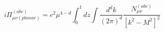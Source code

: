 \begin{equation}
i\Pi_{\mu\nu(planar)}^{(abc)}=e^{2}\mu^{4-d}\int_{0}^{1}dz\int
  \frac{d^{d}k}{(2\pi)^{d}}
  \frac{\textit{N}_{\mu\nu}^{(abc)}}{[k^{2}-M^{2}]^{2}}
  \end{equation}

